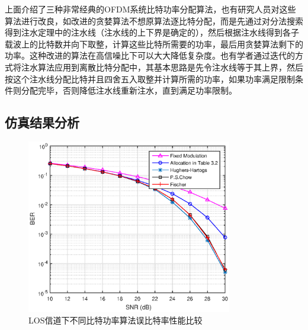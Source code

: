 上面介绍了三种非常经典的OFDM系统比特功率分配算法，也有研究人员对这些算法进行改良，如改进的贪婪算法不想原算法逐比特分配，而是先通过对分法搜索得到注水定理中的注水线（注水线的上下界是确定的\cite{余官定2005ofdm}），然后根据注水线得到各子载波上的比特数并向下取整，计算这些比特所需要的功率，最后用贪婪算法剩下的功率。这种改进的算法在高信噪比下可以大大降低复杂度。也有学者通过迭代的方式将注水算法应用到离散比特分配中，其基本思路是先令注水线等于其上界，然后按这个注水线分配比特并且四舍五入取整并计算所需的功率，如果功率满足限制条件则分配完毕，否则降低注水线重新注水，直到满足功率限制。

\subsection{仿真结果分析}
\begin{figure}[htbp]
\centering
\includegraphics[width=0.8\textwidth]{figures/chapter-4/BERonDiffAlgo.eps}
\caption{LOS信道下不同比特功率算法误比特率性能比较}
\label{fig:berOnDiffAlgo}
\end{figure}

